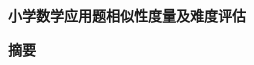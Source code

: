 










%
%

\newpage
\thispagestyle{empty}

\begin{center}
    \textbf{\fontsize{20}{1.5}小学数学应用题相似性度量及难度评估}

    \textbf{摘要}
\end{center}


